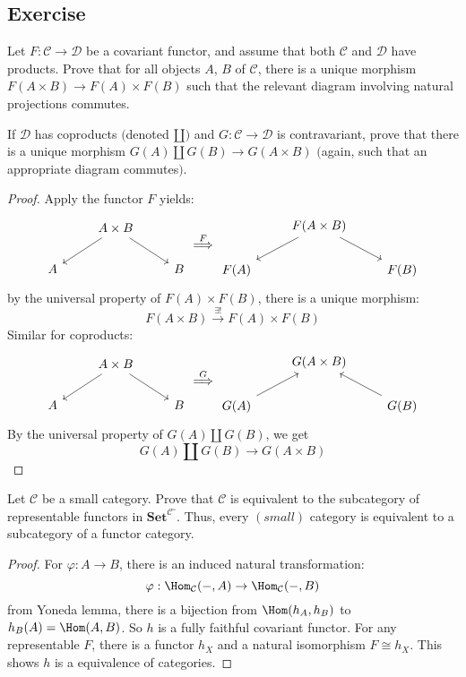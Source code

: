 \subsection{Exercise}
\begin{exercise}
Let $F:\mathcal{C}\to\mathcal{D}$ be a covariant functor, and assume that both $\mathcal{C}$ and $\mathcal{D}$ have products. Prove that for all objects $A$, $B$ of $\mathcal{C}$, there is a unique morphism $F(A\times B)\to F(A)\times F(B)$ such that the relevant diagram involving natural
projections commutes.\par
If $\mathcal{D}$ has coproducts $($denoted $\amalg$$)$ and $G:\mathcal{C}\to\mathcal{D}$ is contravariant, prove that there is a unique morphism $G(A)\amalg G(B)\to G(A\times B)$ $($again, such that an appropriate diagram commutes$)$.
\end{exercise}
\begin{proof}
Apply the functor $F$ yields:
\[\begin{tikzcd}
&A\times B\ar[ld]\ar[rd]&\\
A&&B
\end{tikzcd}\stackrel{F}{\Longrightarrow}\begin{tikzcd}
&F(A\times B)\ar[ld]\ar[rd]&\\
F(A)&&F(B)
\end{tikzcd}\]
by the universal property of $F(A)\times F(B)$, there is a unique morphism:
\[F(A\times B)\stackrel{\exists !}{\longrightarrow}F(A)\times F(B)\]
Similar for coproducts:
\[\begin{tikzcd}
&A\times B\ar[ld]\ar[rd]&\\
A&&B
\end{tikzcd}\stackrel{G}{\Longrightarrow}\begin{tikzcd}
&G(A\times B)&\\
G(A)\ar[ru]&&G(B)\ar[lu]
\end{tikzcd}\]
By the universal property of $G(A)\amalg G(B)$, we get
\[G(A)\amalg G(B)\to G(A\times B)\]
\end{proof}
\begin{exercise}
Let $\mathcal{C}$ be a small category. Prove that $\mathcal{C}$ is equivalent to the subcategory of representable functors in $\mathbf{Set}^{\mathcal{C}^{\circ}}$. Thus, every $(small)$ category is equivalent to a subcategory of a functor category.
\end{exercise}
\begin{proof}
For $\varphi:A\to B$, there is an induced natural transformation:
\[\varphi:\Hom_{\mathcal{C}}(-,A)\to\Hom_{\mathcal{C}}(-,B)\]
from Yoneda lemma, there is a bijection from $\Hom(h_A,h_B)$ to $h_B(A)=\Hom(A,B)$. So $h$ is a fully faithful covariant functor. For any representable $F$, there is a functor $h_X$ and a natural isomorphism $F\cong h_X$. This shows $h$ is a equivalence of categories. 
\end{proof}
